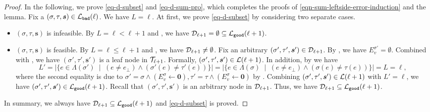 \documentclass[11pt]{article}
\newcommand{\abs}[1]{\left\vert#1\right\vert}
\renewcommand{\mid}{\;\middle\vert\;} \newcommand{\cmid}{\,:\,}
\def\!#1{\mathtt{#1}}
\newcommand{\seqS}{\boldsymbol{s}}
\begin{document}
\begin{proof}
In the following, we prove \eqref{eq-d-subset} and \eqref{eq-d-sum-pro}, which completes the proofs of \eqref{eqn-sum-leftside-error-induction} and the lemma. 
Fix a $(\sigma,\tau,\seqS) \in \+L_{\!{bad}}(\ell)$. We have $L=\ell$.
At first, we prove \eqref{eq-d-subset} by considering two separate cases.
\begin{itemize}
\item $(\sigma,\tau,\seqS)$ is infeasible. By $L =\ell<\ell+1$ and , we have $\+D_{\ell+1} = \emptyset \subseteq \+L_{\!{good}}(\ell+1)$.
\item $(\sigma,\tau,\seqS)$ is feasible.
By $L =\ell\leq \ell+1$ and , we have $\mathcal{D}_{\ell+1}\neq \emptyset$.
Fix an arbitrary $(\sigma',\tau',\seqS')\in \+D_{\ell+1}$.
By , we have 
$E^{\sigma'}_v = \emptyset$.
Combined with ,
we have $(\sigma',\tau',\seqS')$ is a leaf node in $\mathcal{T}_{\ell+1}$.
Formally, $(\sigma',\tau',\seqS')\in \+L(\ell+1)$.
In addition, by 
we have 
\[L' = \abs{\{e\in \Lambda(\sigma')\mid (e\neq e_{\bot})\land (\sigma'(e)\neq \tau'(e))\}} = \abs{\{e\in \Lambda(\sigma)\mid (e\neq e_{\bot})\land (\sigma(e)\neq \tau(e))\}} = L = \ell,\]
where the second equality is due to $\sigma' = \sigma \land (E^{\sigma}_v \gets \boldsymbol{0}),\tau' = \tau \land (E^{\sigma}_v \gets \boldsymbol{0})$
by .
Combining $(\sigma',\tau',\seqS')\in \+L(\ell+1)$ with $L'=\ell$, we have 
$(\sigma',\tau',\seqS') \in \+L_{\!{good}}(\ell+1)$.
Recall that $(\sigma',\tau',\seqS')$ is an arbitrary node in $\mathcal{D}_{\ell+1}$.
Thus, we have $\+D_{\ell+1}\subseteq \+L_{\!{good}}(\ell+1)$.
\end{itemize}
In summary, we always have $\+D_{\ell+1}\subseteq \+L_{\!{good}}(\ell+1)$ and \eqref{eq-d-subset} is proved.


\end{proof}
\end{document}
